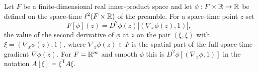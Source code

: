 \begin{definition}
Let $F$ be a finite-dimensional real inner-product space and let
$\phi:F\times\mathbb{R}\to\mathbb{R}$ be defined on the space-time $\ell^2(F\times\mathbb{R})$ of the
preamble. For a space-time point $z$ set
\[
  F[\phi](z)=D^2\phi(z)\bigl[(\nabla_x\phi(z),1)\bigr],
\]
the value of the second derivative of $\phi$ at $z$ on the pair
$(\xi,\xi)$ with $\xi=(\nabla_x\phi(z),1)$, where $\nabla_x\phi(z)\in F$ is the
spatial part of the full space-time gradient $\nabla\phi(z)$. For $F=\mathbb{R}^m$ and
smooth $\phi$ this is $D^2\phi[(\nabla_x\phi,1)]$ in the notation
$A[\xi]=\xi^{\mathsf T}A\xi$.
\end{definition}

